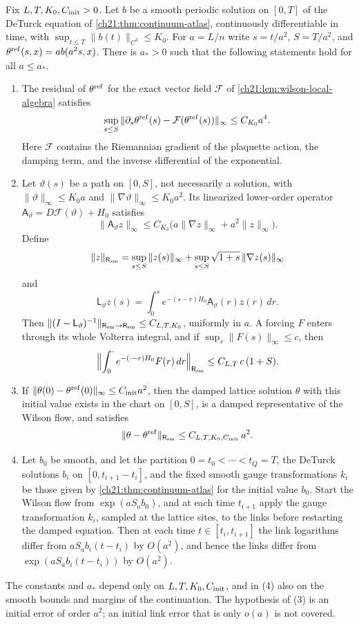 \begin{theorem}\label{ch22:thm:sampled-smooth-stability}
Fix $L,T,K_0,C_{\rm init}>0$. Let $b$ be a smooth periodic solution on $[0,T]$ of the DeTurck equation of \cref{ch21:thm:continuum-atlas}, continuously differentiable in time, with $\sup_{t\le T}\|b(t)\|_{C^3}\le K_0$. For $a=L/n$ write $s=t/a^2$, $S=T/a^2$, and $\theta^{\rm ref}(s,x)=ab(a^2s,x)$. There is $a_*>0$ such that the following statements hold for all $a\le a_*$.
\begin{enumerate}
\item The residual of $\theta^{\rm ref}$ for the exact vector field $\mathcal F$ of \cref{ch21:lem:wilson-local-algebra} satisfies
\[
 \sup_{s\le S}\|\partial_s\theta^{\rm ref}(s)-\mathcal F(\theta^{\rm ref}(s))\|_\infty\le C_{K_0}a^4 .
\]
Here $\mathcal F$ contains the Riemannian gradient of the plaquette action, the damping term, and the inverse differential of the exponential.
\item Let $\vartheta(s)$ be a path on $[0,S]$, not necessarily a solution, with $\|\vartheta\|_\infty\le K_0a$ and $\|\nabla\vartheta\|_\infty\le K_0a^2$. Its linearized lower-order operator $\mathsf A_\vartheta=D\mathcal F(\vartheta)+H_0$ satisfies
\[
 \|\mathsf A_\vartheta z\|_\infty\le C_{K_0}\bigl(a\|\nabla z\|_\infty+a^2\|z\|_\infty\bigr).
\]
Define
\[
 \|z\|_{\mathsf R_{\rm sm}}=\sup_{s\le S}\|z(s)\|_\infty+\sup_{s\le S}\sqrt{1+s}\,\|\nabla z(s)\|_\infty
\]
and
\[
 \mathsf L_\vartheta z(s)=\int_0^se^{-(s-r)H_0}\mathsf A_\vartheta(r)z(r)\,dr .
\]
Then $\|(I-\mathsf L_\vartheta)^{-1}\|_{\mathsf R_{\rm sm}\to\mathsf R_{\rm sm}}\le C_{L,T,K_0}$, uniformly in $a$. A forcing $F$ enters through its whole Volterra integral, and if $\sup_s\|F(s)\|_\infty\le c$, then
\[
 \Bigl\|\int_0^\cdot e^{-(\cdot-r)H_0}F(r)\,dr\Bigr\|_{\mathsf R_{\rm sm}}\le C_{L,T}\,c\,(1+S).
\]
\item If $\|\theta(0)-\theta^{\rm ref}(0)\|_\infty\le C_{\rm init}a^2$, then the damped lattice solution $\theta$ with this initial value exists in the chart on $[0,S]$, is a damped representative of the Wilson flow, and satisfies
\[
 \|\theta-\theta^{\rm ref}\|_{\mathsf R_{\rm sm}}\le C_{L,T,K_0,C_{\rm init}}\,a^2 .
\]
\item Let $b_0$ be smooth, and let the partition $0=t_0<\cdots<t_Q=T$, the DeTurck solutions $b_i$ on $[0,t_{i+1}-t_i]$, and the fixed smooth gauge transformations $k_i$ be those given by \cref{ch21:thm:continuum-atlas} for the initial value $b_0$. Start the Wilson flow from $\exp(aS_ab_0)$, and at each time $t_{i+1}$ apply the gauge transformation $k_i$, sampled at the lattice sites, to the links before restarting the damped equation. Then at each time $t\in[t_i,t_{i+1}]$ the link logarithms differ from $aS_ab_i(t-t_i)$ by $O(a^2)$, and hence the links differ from $\exp(aS_ab_i(t-t_i))$ by $O(a^2)$.
\end{enumerate}
The constants and $a_*$ depend only on $L,T,K_0,C_{\rm init}$, and in (4) also on the smooth bounds and margins of the continuation. The hypothesis of (3) is an initial error of order $a^2$; an initial link error that is only $o(a)$ is not covered.
\end{theorem}

